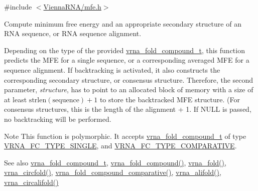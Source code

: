 {\ttfamily \#include $<$\hyperlink{mfe_8h}{Vienna\+R\+N\+A/mfe.\+h}$>$}



Compute minimum free energy and an appropriate secondary structure of an R\+NA sequence, or R\+NA sequence alignment. 

Depending on the type of the provided \hyperlink{group__fold__compound_ga1b0cef17fd40466cef5968eaeeff6166}{vrna\+\_\+fold\+\_\+compound\+\_\+t}, this function predicts the M\+FE for a single sequence, or a corresponding averaged M\+FE for a sequence alignment. If backtracking is activated, it also constructs the corresponding secondary structure, or consensus structure. Therefore, the second parameter, {\itshape structure}, has to point to an allocated block of memory with a size of at least $\mathrm{strlen}(\mathrm{sequence})+1$ to store the backtracked M\+FE structure. (For consensus structures, this is the length of the alignment + 1. If {\ttfamily N\+U\+LL} is passed, no backtracking will be performed.

\begin{DoxyNote}{Note}
This function is polymorphic. It accepts \hyperlink{group__fold__compound_ga1b0cef17fd40466cef5968eaeeff6166}{vrna\+\_\+fold\+\_\+compound\+\_\+t} of type \hyperlink{group__fold__compound_gga01a4ff86fa71deaaa5d1abbd95a1447da7e264dd3cf2dc9b6448caabcb7763cd6}{V\+R\+N\+A\+\_\+\+F\+C\+\_\+\+T\+Y\+P\+E\+\_\+\+S\+I\+N\+G\+LE}, and \hyperlink{group__fold__compound_gga01a4ff86fa71deaaa5d1abbd95a1447dab821ce46ea3cf665be97df22a76f5023}{V\+R\+N\+A\+\_\+\+F\+C\+\_\+\+T\+Y\+P\+E\+\_\+\+C\+O\+M\+P\+A\+R\+A\+T\+I\+VE}.
\end{DoxyNote}
\begin{DoxySeeAlso}{See also}
\hyperlink{group__fold__compound_ga1b0cef17fd40466cef5968eaeeff6166}{vrna\+\_\+fold\+\_\+compound\+\_\+t}, \hyperlink{group__fold__compound_ga6601d994ba32b11511b36f68b08403be}{vrna\+\_\+fold\+\_\+compound()}, \hyperlink{group__mfe__fold__single_ga29a33b2895f4e67b0480271ff289afdc}{vrna\+\_\+fold()}, \hyperlink{group__mfe__fold__single_gaf973483d8acbc8cc9aacfc8a9b7f0074}{vrna\+\_\+circfold()}, \hyperlink{group__fold__compound_gad6bacc816af274922b13d947f708aa0c}{vrna\+\_\+fold\+\_\+compound\+\_\+comparative()}, \hyperlink{group__consensus__mfe__fold_ga6c9d3bef3e92c6d423ffac9f981418c1}{vrna\+\_\+alifold()}, \hyperlink{group__consensus__mfe__fold_ga17a1be7490468c29c335ba9bffacba53}{vrna\+\_\+circalifold()}
\end{DoxySeeAlso}

